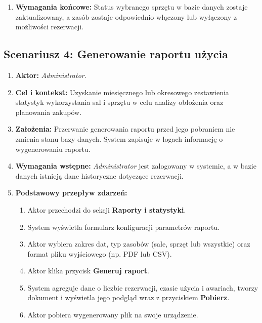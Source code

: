 \documentclass[11pt, a4paper]{article}
\begin{document}
\begin{enumerate}
\begin{itemize}
\begin{enumerate}
            \item \textbf{4a.2. Administrator przerywa operację (podwójne rozgałęzienie):} System cofa zmianę statusu i powraca do kroku 2.
        \end{enumerate}
    \end{itemize}
    \item \textbf{Wymagania końcowe:} Status wybranego sprzętu w bazie danych zostaje zaktualizowany, a zasób zostaje odpowiednio włączony lub wyłączony z możliwości rezerwacji.
\end{enumerate}

\subsection{Scenariusz 4: Generowanie raportu użycia}
\begin{enumerate}
    \item \textbf{Aktor:} \textit{Administrator}.
    \item \textbf{Cel i kontekst:} Uzyskanie miesięcznego lub okresowego zestawienia statystyk wykorzystania sal i sprzętu w celu analizy obłożenia oraz planowania zakupów.
    \item \textbf{Założenia:} Przerwanie generowania raportu przed jego pobraniem nie zmienia stanu bazy danych. System zapisuje w logach informację o wygenerowaniu raportu.
    \item \textbf{Wymagania wstępne:} \textit{Administrator} jest zalogowany w systemie, a w bazie danych istnieją dane historyczne dotyczące rezerwacji.
    \item \textbf{Podstawowy przepływ zdarzeń:}
    \begin{enumerate}
        \item Aktor przechodzi do sekcji \textbf{Raporty i statystyki}.
        \item System wyświetla formularz konfiguracji parametrów raportu.
        \item Aktor wybiera zakres dat, typ zasobów (sale, sprzęt lub wszystkie) oraz format pliku wyjściowego (np. PDF lub CSV).
        \item Aktor klika przycisk \textbf{Generuj raport}.
        \item System agreguje dane o liczbie rezerwacji, czasie użycia i awariach, tworzy dokument i wyświetla jego podgląd wraz z przyciskiem \textbf{Pobierz}.
        \item Aktor pobiera wygenerowany plik na swoje urządzenie.
    \end{enumerate}

\end{enumerate}
\end{document}
